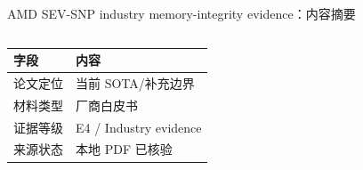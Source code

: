 \begin{frame}[t,shrink=6]{AMD SEV-SNP industry memory-integrity evidence：内容摘要}
\begin{columns}[T,totalwidth=\textwidth]
\begin{column}{0.49\textwidth}
{\begin{minipage}[t]{0.97\linewidth}
    \hspace{1.4mm}\begin{minipage}{0.92\linewidth}
      \scriptsize {\tiny
\begin{tabularx}{\linewidth}{@{}YY@{}}
\toprule
\textbf{字段} & \textbf{内容} \\
\midrule
论文定位 & 当前 SOTA/补充边界 \\
材料类型 & 厂商白皮书 \\
证据等级 & E4 / Industry evidence \\
来源状态 & 本地 PDF 已核验 \\
\bottomrule
\end{tabularx}
}
    \end{minipage}
    \vspace{1mm}
  \end{minipage}}
  \end{column}
\end{columns}
\end{frame}


